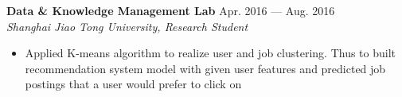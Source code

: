 \documentclass[margin,line,11pt]{res}
\begin{document}
\begin{resume}
{\small
{\bf\normalsize Data \& Knowledge Management Lab} \hfill Apr. 2016 --- Aug. 2016 \\
{\it Shanghai Jiao Tong University, Research Student} 
}
\begin{itemize}
\setlength{\itemsep}{0pt}
\setlength{\parskip}{0pt}
\setlength{\parsep}{0pt}
\item {\small Applied K-means algorithm to realize user and job clustering. Thus to built recommendation system model with given user features and predicted job postings that a user would prefer to click on}
\end{itemize}

{
\small
}



\end{resume}
\end{document}
